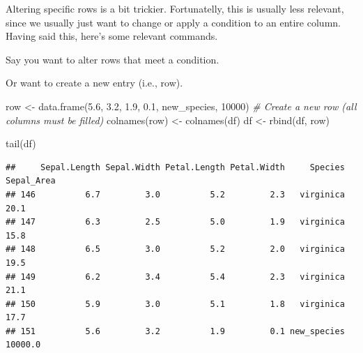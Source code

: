 \documentclass[
]{book}
\newenvironment{Shaded}{\begin{snugshade}}{\end{snugshade}}
\newcommand{\CommentTok}[1]{\textcolor[rgb]{0.56,0.35,0.01}{\textit{#1}}}
\newcommand{\DecValTok}[1]{\textcolor[rgb]{0.00,0.00,0.81}{#1}}
\newcommand{\FloatTok}[1]{\textcolor[rgb]{0.00,0.00,0.81}{#1}}
\newcommand{\FunctionTok}[1]{\textcolor[rgb]{0.00,0.00,0.00}{#1}}
\newcommand{\NormalTok}[1]{#1}
\newcommand{\OtherTok}[1]{\textcolor[rgb]{0.56,0.35,0.01}{#1}}
\newcommand{\SpecialCharTok}[1]{\textcolor[rgb]{0.00,0.00,0.00}{#1}}
\newcommand{\StringTok}[1]{\textcolor[rgb]{0.31,0.60,0.02}{#1}}
\begin{document}
Altering specific rows is a bit trickier.
Fortunatelly, this is usually less relevant, since we usually just want to change or apply a condition to an entire column.
Having said this, here's some relevant commands.

Say you want to alter rows that meet a condition.

\begin{Shaded}
\end{Shaded}

Or want to create a new entry (i.e., row).

\begin{Shaded}
\begin{Highlighting}[]
\NormalTok{row }\OtherTok{\textless{}{-}} \FunctionTok{data.frame}\NormalTok{(}\FloatTok{5.6}\NormalTok{, }\FloatTok{3.2}\NormalTok{, }\FloatTok{1.9}\NormalTok{, }\FloatTok{0.1}\NormalTok{, }\StringTok{\textquotesingle{}new\_species\textquotesingle{}}\NormalTok{, }\DecValTok{10000}\NormalTok{)  }\CommentTok{\# Create a new row (all columns must be filled)}
\FunctionTok{colnames}\NormalTok{(row) }\OtherTok{\textless{}{-}} \FunctionTok{colnames}\NormalTok{(df)}
\NormalTok{df }\OtherTok{\textless{}{-}} \FunctionTok{rbind}\NormalTok{(df, row)}

\FunctionTok{tail}\NormalTok{(df)}
\end{Highlighting}
\end{Shaded}

\begin{verbatim}
##     Sepal.Length Sepal.Width Petal.Length Petal.Width     Species Sepal_Area
## 146          6.7         3.0          5.2         2.3   virginica       20.1
## 147          6.3         2.5          5.0         1.9   virginica       15.8
## 148          6.5         3.0          5.2         2.0   virginica       19.5
## 149          6.2         3.4          5.4         2.3   virginica       21.1
## 150          5.9         3.0          5.1         1.8   virginica       17.7
## 151          5.6         3.2          1.9         0.1 new_species    10000.0
\end{verbatim}
\end{document}
